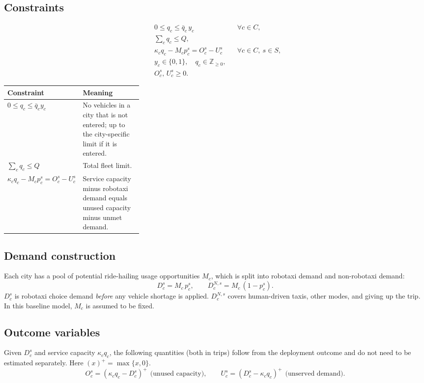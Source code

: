 \documentclass[10pt,a4paper]{article}
\begin{document}
\subsection{Constraints}

\[
\begin{aligned}
&0\le q_c\le \bar q_c\, y_c && \forall c\in C,\\
&\textstyle\sum_{c} q_c\le Q, &&\\
&\kappa_c q_c - M_c p_c^{s} = O_c^{s}-U_c^{s} && \forall c\in C,\ s\in S,\\
&y_c\in\{0,1\},\quad q_c\in\mathbb{Z}_{\ge 0}, &&\\
&O_c^{s},\,U_c^{s}\ge 0. &&
\end{aligned}
\]

{\small
\begin{tabularx}{\linewidth}{@{}>{\raggedright\arraybackslash}p{0.32\linewidth}Y@{}}
\toprule
Constraint & Meaning \\ \midrule
$0\le q_c\le\bar q_c y_c$ & No vehicles in a city that is not entered; up to the city-specific limit if it is entered. \\
$\sum_c q_c\le Q$ & Total fleet limit. \\
$\kappa_c q_c-M_c p_c^s=O_c^s-U_c^s$ & Service capacity minus robotaxi demand equals unused capacity minus unmet demand. \\
\bottomrule
\end{tabularx}
}

\subsection{Demand construction}

Each city has a pool of potential ride-hailing usage opportunities $M_c$, which is
split into robotaxi demand and non-robotaxi demand:
\[
D_c^{s}=M_c\,p_c^{s},\qquad D_c^{N,s}=M_c\,(1-p_c^{s}).
\]
$D_c^{s}$ is robotaxi choice demand \emph{before} any vehicle shortage is applied.
$D_c^{N,s}$ covers human-driven taxis, other modes, and giving up the trip. In this baseline model, $M_c$ is assumed to be fixed.

\subsection{Outcome variables}

Given $D_c^{s}$ and service capacity $\kappa_c q_c$, the following quantities
(both in trips) follow from the deployment outcome and do not need to be
estimated separately. Here $(x)^+=\max\{x,0\}$.
\[
O_c^{s}=(\kappa_c q_c-D_c^{s})^{+}\ \ \text{(unused capacity)},\qquad
U_c^{s}=(D_c^{s}-\kappa_c q_c)^{+}\ \ \text{(unserved demand)}.
\]
\end{document}
